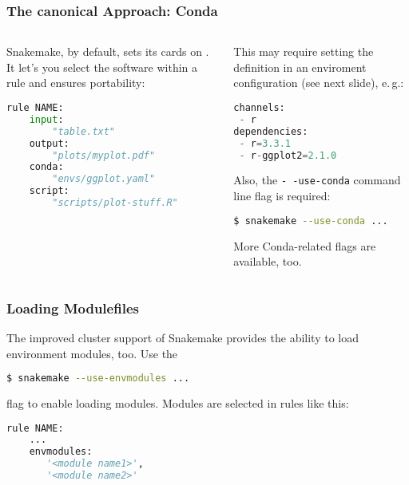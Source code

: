 \begin{frame}[fragile]
  \frametitle{The canonical Approach: Conda}
  \begin{columns}
    \begin{column}{0.5\textwidth}
      Snakemake, by default, sets its cards on . It let's you select the software within a rule and ensures portability:
      \begin{lstlisting}[language=Python,style=Python]
rule NAME:
    input:
        "table.txt"
    output:
        "plots/myplot.pdf"
    conda:
        "envs/ggplot.yaml"
    script:
        "scripts/plot-stuff.R"
      \end{lstlisting}\pause
    \end{column}
    \begin{column}{0.5\textwidth}
      
  This may require setting the definition in an enviroment configuration (see next slide), e.\,g.:
  \begin{lstlisting}[language=Python,style=Python]
channels:
 - r
dependencies:
 - r=3.3.1
 - r-ggplot2=2.1.0
  \end{lstlisting}
  \pause
  Also, the \texttt{-\,-use-conda} command line flag is required:
  \begin{lstlisting}[language=Bash, style=Shell]
$ snakemake --use-conda ...
  \end{lstlisting}
  More Conda-related flags are available, too.
    \end{column}
  \end{columns}
\end{frame}

\begin{frame}[fragile]
  \frametitle{Loading Modulefiles}
  The improved cluster support of Snakemake provides the ability to load environment modules, too. Use the
  \begin{lstlisting}[language=Bash, style=Shell]
$ snakemake --use-envmodules ...
  \end{lstlisting}
  flag to enable loading modules.\newline
  Modules are selected in rules like this:
  \begin{lstlisting}[language=Python,style=Python]
rule NAME:
    ...
    envmodules:
       '<module name1>',
       '<module name2>'
  \end{lstlisting}
\end{frame}

